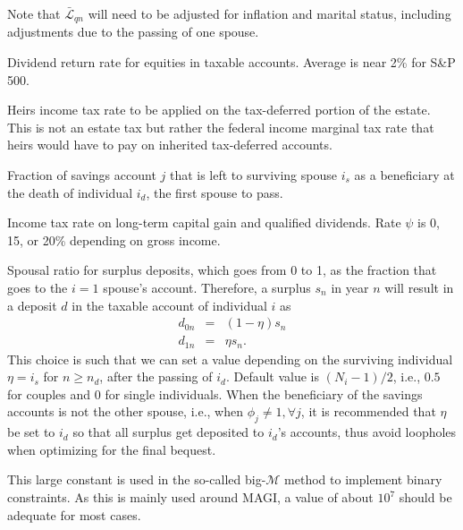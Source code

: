 \documentclass{report}[fleqn,11pt]
\begin{document}
\begin{description}[leftmargin=4em,style=multiline]
        Note that $\bar{\mathcal{L}}_{qn}$ will need to be adjusted for inflation and marital status,
        including adjustments due to the passing of one spouse.
\item [$\mu$]
	Dividend return rate for equities in taxable accounts. Average is near 2\% for S\&P 500.
\item [$\nu$]
	Heirs income tax rate to be applied on the tax-deferred portion of the estate. This is not an estate tax
	but rather the federal income marginal tax rate that heirs would have to pay on inherited tax-deferred accounts.
\item [$\phi_j$]
	Fraction of savings account $j$ that is left to surviving spouse $i_s$ as a beneficiary
	at the death of individual $i_d$, the first spouse to pass.
\item [$\psi$]
	Income tax rate on long-term capital gain and qualified dividends. Rate $\psi$ is 0, 15, or 20\%
	depending on gross income.
\item [$\eta$]
	Spousal ratio for surplus deposits, which goes from 0 to 1, as the fraction
	that goes to the $i = 1$ spouse's account. Therefore, a surplus $s_n$ in year $n$
	will result in a deposit $d$ in the taxable account of individual $i$ as
	\begin{eqnarray}
		\label{Eq:eta}
		d_{0n} & = & (1 - \eta) s_n \nonumber\\
		d_{1n} & = & \eta s_n.
	\end{eqnarray}
	This choice is such that we can set a value depending on the surviving
	individual $\eta = i_s$ for $n \ge n_d$, after the passing of $i_d$.
	Default value is $(N_i - 1)/2$, i.e., $0.5$ for couples and $0$ for single individuals.
	When the beneficiary of the savings accounts is not the other spouse, i.e., 
	when $\phi_j \neq 1, \forall j$, it is recommended that $\eta$ be set to $i_d$ so that
	all surplus get deposited to $i_d$'s accounts,
	thus avoid loopholes when optimizing for the final bequest.
\item[$\mathcal{M}$]
	This large constant is used in the so-called big-$\mathcal{M}$ method to implement
	binary constraints. As this is mainly used around MAGI, a value of about $10^7$ should
	be adequate for most cases.
\end{description}
\end{document}
